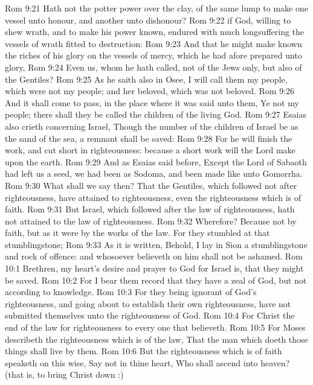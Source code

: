 \vs Rom 9:21 Hath not the potter power over the clay, of the same lump to make one vessel unto honour, and another unto dishonour?
\vs Rom 9:22  if God, willing to shew  wrath, and to make his power known, endured with much longsuffering the vessels of wrath fitted to destruction:
\vs Rom 9:23 And that he might make known the riches of his glory on the vessels of mercy, which he had afore prepared unto glory,
\vs Rom 9:24 Even us, whom he hath called, not of the Jews only, but also of the Gentiles?
\vs Rom 9:25 As he saith also in Osee, I will call them my people, which were not my people; and her beloved, which was not beloved.
\vs Rom 9:26 And it shall come to pass,  in the place where it was said unto them, Ye  not my people; there shall they be called the children of the living God.
\vs Rom 9:27 Esaias also crieth concerning Israel, Though the number of the children of Israel be as the sand of the sea, a remnant shall be saved:
\vs Rom 9:28 For he will finish the work, and cut  short in righteousness: because a short work will the Lord make upon the earth.
\vs Rom 9:29 And as Esaias said before, Except the Lord of Sabaoth had left us a seed, we had been as Sodoma, and been made like unto Gomorrha.
\vs Rom 9:30 What shall we say then? That the Gentiles, which followed not after righteousness, have attained to righteousness, even the righteousness which is of faith.
\vs Rom 9:31 But Israel, which followed after the law of righteousness, hath not attained to the law of righteousness.
\vs Rom 9:32 Wherefore? Because  not by faith, but as it were by the works of the law. For they stumbled at that stumblingstone;
\vs Rom 9:33 As it is written, Behold, I lay in Sion a stumblingstone and rock of offence: and whosoever believeth on him shall not be ashamed.
\vs Rom 10:1 Brethren, my heart's desire and prayer to God for Israel is, that they might be saved.
\vs Rom 10:2 For I bear them record that they have a zeal of God, but not according to knowledge.
\vs Rom 10:3 For they being ignorant of God's righteousness, and going about to establish their own righteousness, have not submitted themselves unto the righteousness of God.
\vs Rom 10:4 For Christ  the end of the law for righteousness to every one that believeth.
\vs Rom 10:5 For Moses describeth the righteousness which is of the law, That the man which doeth those things shall live by them.
\vs Rom 10:6 But the righteousness which is of faith speaketh on this wise, Say not in thine heart, Who shall ascend into heaven? (that is, to bring Christ down :)
